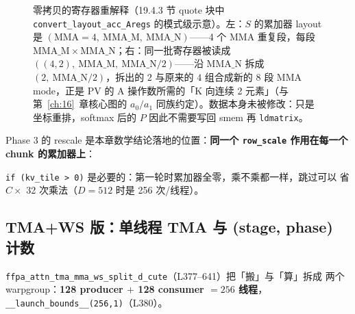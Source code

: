 \begin{figure}[H]
\caption{零拷贝的寄存器重解释（19.4.3 节 quote 块中 \texttt{convert\_layout\_acc\_Aregs} 的模式级示意）。左：$S$ 的累加器 layout 是 $(\mathrm{MMA}{=}4,\ \mathrm{MMA\_M},\ \mathrm{MMA\_N})$——4 个 MMA 重复段，每段 $\mathrm{MMA\_M}\times\mathrm{MMA\_N}$；右：同一批寄存器被读成 $((4,2),\ \mathrm{MMA\_M},\ \mathrm{MMA\_N}/2)$——沿 $\mathrm{MMA\_N}$ 拆成 $(2,\ \mathrm{MMA\_N}/2)$，拆出的 $2$ 与原来的 $4$ 组合成新的 $8$ 段 MMA mode，正是 PV 的 A 操作数所需的「K 向连续 2 元素」（与第~\ref{ch:16}~章核心图的 $a_0/a_1$ 同族约定）。数据本身未被修改：只是坐标重排，softmax 后的 $P$ 因此不需要写回 smem 再 \texttt{ldmatrix}。}
\label{fig:19-aregs-reinterpret}
\end{figure}

Phase 3 的 rescale 是本章数学结论落地的位置：\textbf{同一个 \texttt{row\_scale}
作用在每一个 chunk 的累加器上}：



\texttt{if (kv\_tile > 0)} 是必要的：第一轮时累加器全零，乘不乘都一样，跳过可以
省 $C \times$ 32 次乘法（$D=512$ 时是 256 次/线程）。

\subsection{TMA+WS 版：单线程 TMA 与 (stage, phase) 计数}

\texttt{ffpa\_\allowbreak{}attn\_\allowbreak{}tma\_\allowbreak{}mma\_\allowbreak{}ws\_\allowbreak{}split\_\allowbreak{}d\_\allowbreak{}cute}（L377--641）把「搬」与「算」拆成
两个 warpgroup：\textbf{128 producer $+$ 128 consumer $= 256$ 线程}，
\texttt{\_\allowbreak{}\_\allowbreak{}launch\_\allowbreak{}bounds\_\allowbreak{}\_\allowbreak{}(256,\allowbreak{}1)}（L380）。

